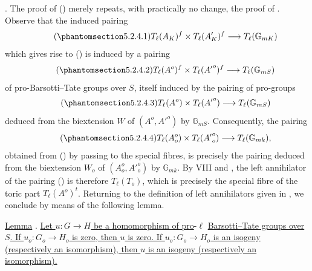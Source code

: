 \smallskip
\noindent
{}. The proof of () merely repeats, with practically no change,
the proof of .  Observe that the induced pairing
\begin{equation}\tag{\SGARefTarget{sga7.sga7i.eix.n5-2-4-1}{5.2.4.1}}
 T_\ell(A_K)^f\times T_\ell(A'_K)^f
 \longrightarrow T_\ell(\mathbb G_{mK})
\end{equation}
which gives rise to () is induced by a pairing
\begin{equation}\tag{\SGARefTarget{sga7.sga7i.eix.n5-2-4-2}{5.2.4.2}}
 T_\ell(A^o)^f\times T_\ell({A'}^o)^f
 \longrightarrow T_\ell(\mathbb G_{mS})
\end{equation}
of pro-Barsotti--Tate groups over $S$, itself induced by the pairing
of pro-groups
\begin{equation}\tag{\SGARefTarget{sga7.sga7i.eix.n5-2-4-3}{5.2.4.3}}
 T_\ell(A^o)\times T_\ell({A'}^o)
 \longrightarrow T_\ell(\mathbb G_{mS})
\end{equation}
deduced from the biextension $W$ of $(A^o,{A'}^o)$ by
$\mathbb G_{mS}$.  Consequently, the pairing
\begin{equation}\tag{\SGARefTarget{sga7.sga7i.eix.n5-2-4-4}{5.2.4.4}}
 T_\ell(A_o^o)\times T_\ell({A'}_o^o)
 \longrightarrow T_\ell(\mathbb G_{mk}),
\end{equation}
obtained from () by passing to the special fibres, is precisely
the pairing deduced from the biextension $W_o$ of
$(A_o^o,{A'}_o^o)$ by $\mathbb G_{mk}$.  By VIII  and ,
the left annihilator of the pairing () is therefore
$T_\ell(T_o)$, which is precisely the special fibre of the toric part
$T_\ell(A^o)^t$.  Returning to the definition of left annihilators
given in , we conclude by means of the following lemma.

\medskip
\noindent
\underline{Lemma} . \underline{Let $u:G\longrightarrow H$ be a
homomorphism of pro}-$\ell$ \underline{Barsotti--Tate groups over $S$.  If
$u_o:G_o\longrightarrow H_o$ is zero, then $u$ is zero.  If
$u_o:G_o\longrightarrow H_o$ is an isogeny (respectively an
isomorphism), then $u$ is an isogeny (respectively an isomorphism).}

